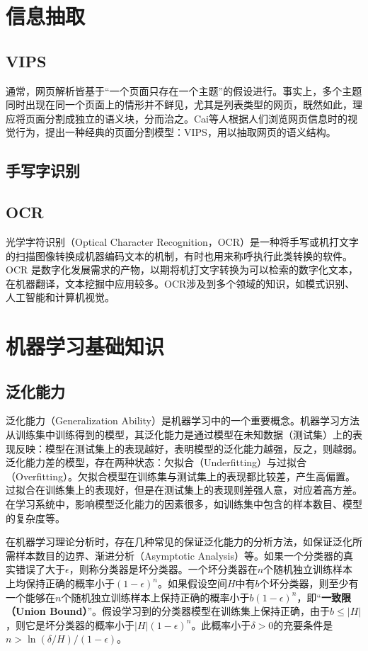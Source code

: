 \chapter{信息抽取}
\section{VIPS}
通常，网页解析皆基于“一个页面只存在一个主题”的假设进行。事实上，多个主题同时出现在同一个页面上的情形并不鲜见，尤其是列表类型的网页，既然如此，理应将页面分割成独立的语义块，分而治之。Cai等人根据人们浏览网页信息时的视觉行为，提出一种经典的页面分割模型：VIPS\cite{cai2003vips}，用以抽取网页的语义结构。

\section{手写字识别}%

\section{OCR}
光学字符识别（Optical Character Recognition，OCR）是一种将手写或机打文字的扫描图像转换成机器编码文本的机制，有时也用来称呼执行此类转换的软件。OCR 是数字化发展需求的产物，以期将机打文字转换为可以检索的数字化文本，在机器翻译，文本挖掘中应用较多。OCR涉及到多个领域的知识，如模式识别、人工智能和计算机视觉。

\chapter{机器学习基础知识}
\section{泛化能力}
泛化能力（Generalization Ability）是机器学习中的一个重要概念。机器学习方法从训练集中训练得到的模型，其泛化能力是通过模型在未知数据（测试集）上的表现反映：模型在测试集上的表现越好，表明模型的泛化能力越强，反之，则越弱。泛化能力差的模型，存在两种状态：欠拟合（Underfitting）与过拟合（Overfitting）。欠拟合模型在训练集与测试集上的表现都比较差，产生高偏置。过拟合在训练集上的表现好，但是在测试集上的表现则差强人意，对应着高方差。在学习系统中，影响模型泛化能力的因素很多，如训练集中包含的样本数目、模型的复杂度等\cite{freund2003efficient}。

在机器学习理论分析时，存在几种常见的保证泛化能力的分析方法，如保证泛化所需样本数目的边界、渐进分析（Asymptotic Analysis）等。如果一个分类器的真实错误了大于$\epsilon$，则称分类器是坏分类器。一个坏分类器在$n$个随机独立训练样本上均保持正确的概率小于$(1-\epsilon)^n$。如果假设空间$H$中有$b$个坏分类器，则至少有一个能够在$n$个随机独立训练样本上保持正确的概率小于$b(1-\epsilon)^n$，即“\textbf{一致限（Union Bound）}”。假设学习到的分类器模型在训练集上保持正确，由于$b\le |H|$，则它是坏分类器的概率小于$|H|(1-\epsilon)^n$。此概率小于$\delta>0$的充要条件是$n>\ln(\delta/H)/(1-\epsilon)$。

